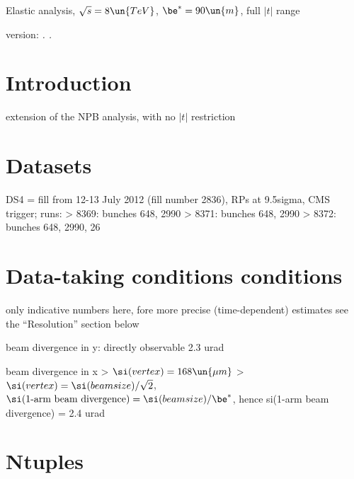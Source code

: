


\def\baseDir{/afs/cern.ch/work/j/jkaspar/analyses/elastic/4000GeV,beta90,high_t}
\def\release{}


\centerline{\SetFontSizesXX Elastic analysis, $\sqrt s = 8\un{TeV}$, $\be^* = 90\un{m}$, full $|t|$ range}
\vskip2mm
\centerline{version: {\it \number\day. \number\month. \number\year}}


\section{Introduction}

\> extension of the NPB analysis, with no $|t|$ restriction


\section{Datasets}

\> DS4 = fill from 12-13 July 2012 (fill number 2836), RPs at 9.5sigma, CMS trigger; runs:
\>> 8369: bunches 648, 2990
\>> 8371: bunches 648, 2990
\>> 8372: bunches 648, 2990, 26


\section{Data-taking conditions conditions}

\> only indicative numbers here, fore more precise (time-dependent) estimates see the ``Resolution''
section below

\> beam divergence in y: directly observable 2.3 urad

\> beam divergence in x
\>> $\si(vertex) = 168\un{\mu m}$
\>> $\si(vertex) = \si(beam size) / \sqrt 2$, $\si(\hbox{1-arm beam divergence}) = \si(beam size) / \be^*$, hence 
	si(1-arm beam divergence) = 2.4 urad


\section{Ntuples}

